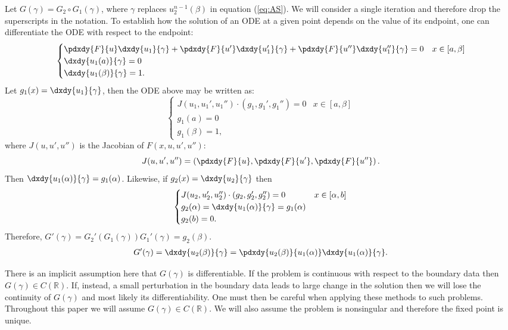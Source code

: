 \documentclass{article}
\begin{document}
Let $G(\gamma) = G_2 \circ G_1(\gamma)$, where $\gamma$ replaces $u^{n-1}_2(\beta)$ in equation (\ref{eq:AS}).
We will consider a single iteration and therefore drop the superscripts in the notation.
To establish how the solution of an ODE at a given point depends on the value of its endpoint, one can differentiate the ODE with respect to the endpoint:
\begin{align*}
\begin{cases} \pdxdy{F}{u} \dxdy{u_1}{\gamma} + \pdxdy{F}{u'} \dxdy{u_1'}{\gamma} + \pdxdy{F}{u''} \dxdy{u_1''}{\gamma} = 0 & x \in [a,\beta] \\
\dxdy{u_1(a)}{\gamma} = 0 \\
\dxdy{u_1(\beta)}{\gamma} = 1. \end{cases}
\end{align*}
Let $g_1(x) = \dxdy{u_1}{\gamma}$, then the ODE above may be written as:
\begin{equation*}
\begin{cases} J(u_1,u_1',u_1'') \cdot (g_1, g_1', g_1'') = 0 & x \in [a,\beta] \\ g_1(a) = 0 \\ g_1(\beta) = 1, \end{cases}
\end{equation*}
where $J(u,u',u'')$ is the Jacobian of $F(x,u,u',u'')$:
\begin{equation} \label{eq:Jacobian}
J(u,u',u'') = \left ( \pdxdy{F}{u}, \pdxdy{F}{u'}, \pdxdy{F}{u''} \right ) .
\end{equation}
Then $\dxdy{u_1(\alpha)}{\gamma} = g_1(\alpha)$.
Likewise, if $g_2(x) = \dxdy{u_2}{\gamma}$ then
\begin{equation*}
\begin{cases} J(u_2,u_2',u_2'') \cdot (g_2, g_2', g_2'') = 0 & x \in [\alpha,b] \\
g_2(\alpha) = \dxdy{u_1(\alpha)}{\gamma} = g_1(\alpha) \\ g_2(b) = 0 . \end{cases}
\end{equation*}
Therefore, $G'(\gamma) = G_2'(G_1(\gamma)) G_1'(\gamma) = g_2(\beta)$.
\begin{align*}
G'(\gamma) = \dxdy{u_2(\beta)}{\gamma} = \pdxdy{u_2(\beta)}{u_1(\alpha)} \dxdy{u_1(\alpha)}{\gamma} .
\end{align*}

There is an implicit assumption here that $G(\gamma)$ is differentiable.
If the problem is continuous with respect to the boundary data then $G(\gamma) \in C(\mathbb{R})$.
If, instead, a small perturbation in the boundary data leads to large change in the solution then we will lose the continuity of $G(\gamma)$ and most likely its differentiability.
One must then be careful when applying these methods to such problems.
Throughout this paper we will assume $G(\gamma) \in C(\mathbb{R})$.
We will also assume the problem is nonsingular and therefore the fixed point is unique.
\end{document}
